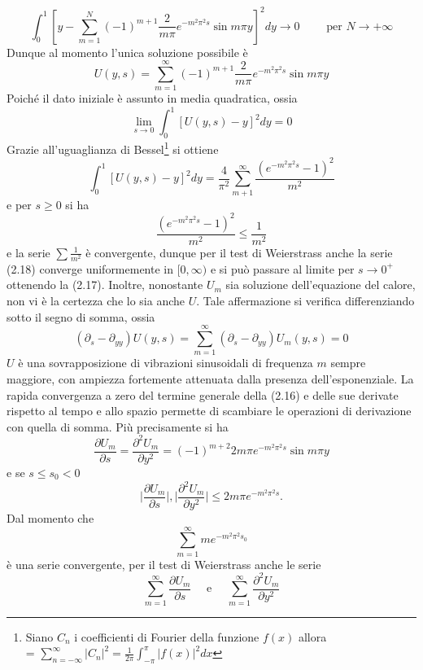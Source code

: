 \documentclass[a4paper,12pt, draft]{article}
\theoremstyle{break}
\numberwithin{equation}{section}
\begin{document}
$$
\int_0^1[y-\sum_{m=1}^N(-1)^{m+1} \frac{2}{m \pi} e^{-m^2 \pi^2s} \sin{m\pi y}]^2dy \to 0 \qquad \mbox{ per } N \to +\infty
$$
Dunque al momento l'unica soluzione possibile è
\begin{equation}
U(y,s) = \sum_{m=1}^{\infty} (-1)^{m+1} \frac{2}{m \pi} e^{-m^2\pi^2s} \sin{m \pi y}
\end{equation}
Poiché il dato iniziale è assunto in media quadratica, ossia
\begin{equation}
\lim_{s \to 0} \int_0^1[U(y,s)-y]^2dy=0
\end{equation}
Grazie all'uguaglianza di Bessel\footnote{Siano $C_n$ i coefficienti di Fourier della funzione $f(x)$ allora\\
 {\everymath ={\displaystyle} $\sum_{n=-\infty}^{\infty} |C_n|^2 = \frac{1}{2\pi}\int_{-\pi}^{\pi}|f(x)|^2dx$}} si ottiene 
\begin{equation}
\int_0^1 [U(y,s) - y]^2dy = \frac{4}{\pi^2}\sum_{m+1}^{\infty} \frac{(e^{-m^2\pi^2s}-1)^2}{m^2}
\end{equation}
e per $s \geq 0$ si ha
$$
\frac{(e^{-m^2\pi^2s}-1)^2}{m^2} \leq \frac{1}{m^2}
$$
e la serie $\sum \frac{1}{m^2}$ è convergente, dunque per il test di Weierstrass anche la serie (2.18) converge uniformemente in $[0, \infty)$ e si può passare al limite per $s \to 0^+$ ottenendo la (2.17).
Inoltre, nonostante $U_m$ sia soluzione dell'equazione del calore, non vi è la certezza che lo sia anche $U$. Tale affermazione si verifica differenziando sotto il segno di somma, ossia 
\begin{equation}
(\partial_s - \partial_{yy}) U(y,s) = \sum_{m=1}^{\infty}(\partial_s - \partial_{yy})U_m(y,s) = 0
\end{equation}
$U$ è una sovrapposizione di vibrazioni sinusoidali di frequenza $m$ sempre maggiore, con ampiezza fortemente attenuata dalla presenza dell'esponenziale. La rapida convergenza a zero del termine generale della (2.16) e delle sue derivate rispetto al tempo e allo spazio permette di scambiare le operazioni di derivazione con quella di somma. Più precisamente si ha $$\frac{\partial U_m}{\partial s} = \frac{\partial^2 U_m}{\partial y^2} = (-1)^{m+2}2m \pi e^{-m^2\pi^2s}\sin{m\pi y}$$ 
e se $s\leq s_0 < 0$
$$\bigg\lvert \frac{\partial U_m}{\partial s} \bigg\rvert , \bigg\lvert \frac{\partial^2 U_m}{\partial y^2}\bigg\rvert \leq 2 m \pi e^{-m^2\pi^2s}.$$
Dal momento che 
$$\sum_{m=1}^{\infty} me^{-m^2\pi^2s_0}$$
è una serie convergente, per il test di Weierstrass anche le serie
$$\sum_{m=1}^{\infty} \frac{\partial U_m}{\partial s} \quad \mbox{ e } \quad \sum_{m=1}^{\infty} \frac{\partial^2 U_m}{\partial y^2}$$
\end{document}
